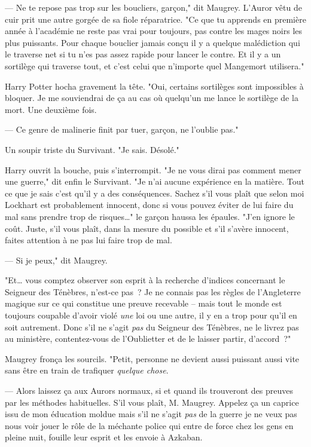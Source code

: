 --- Ne te repose pas trop sur les boucliers, garçon," dit Maugrey. L'Auror vêtu de cuir prit une autre gorgée de sa fiole réparatrice. "Ce que tu apprends en première année à l'académie ne reste pas vrai pour toujours, pas contre les mages noirs les plus puissants. Pour chaque bouclier jamais conçu il y a quelque malédiction qui le traverse net si tu n'es pas assez rapide pour lancer le contre. Et il y a un sortilège qui traverse tout, et c'est celui que n'importe quel Mangemort utilisera."

Harry Potter hocha gravement la tête. "Oui, certains sortilèges sont impossibles à bloquer. Je me souviendrai de ça au cas où quelqu'un me lance le sortilège de la mort. Une deuxième fois.

--- Ce genre de malinerie finit par tuer, garçon, ne l'oublie pas."

Un soupir triste du Survivant. "Je sais. Désolé."

Harry ouvrit la bouche, puis s'interrompit. "Je ne vous dirai pas comment mener une guerre," dit enfin le Survivant. "Je n'ai aucune expérience en la matière. Tout ce que je sais c'est qu'il y a des conséquences. Sachez s'il vous plaît que selon moi Lockhart est probablement innocent, donc si vous pouvez éviter de lui faire du mal sans prendre trop de risques…" le garçon haussa les épaules. "J'en ignore le coût. Juste, s'il vous plaît, dans la mesure du possible et s'il s'avère innocent, faites attention à ne pas lui faire trop de mal.

--- Si je peux," dit Maugrey.

"Et… vous comptez observer son esprit à la recherche d'indices concernant le Seigneur des Ténèbres, n'est-ce pas~? Je ne connais pas les règles de l'Angleterre magique sur ce qui constitue une preuve recevable -- mais tout le monde est toujours coupable d'avoir violé \emph{une} loi ou une autre, il y en a trop pour qu'il en soit autrement. Donc s'il ne s'agit \emph{pas} du Seigneur des Ténèbres, ne le livrez pas au ministère, contentez-vous de l'Oublietter et de le laisser partir, d'accord~?"

Maugrey fronça les sourcils. "Petit, personne ne devient aussi puissant aussi vite sans être en train de trafiquer \emph{quelque chose}.

--- Alors laissez ça aux Aurors normaux, si et quand ils trouveront des preuves par les méthodes habituelles. S'il vous plaît, M. Maugrey. Appelez ça un caprice issu de mon éducation moldue mais s'il ne s'agit \emph{pas} de la guerre je ne veux pas nous voir jouer le rôle de la méchante police qui entre de force chez les gens en pleine nuit, fouille leur esprit et les envoie à Azkaban.

